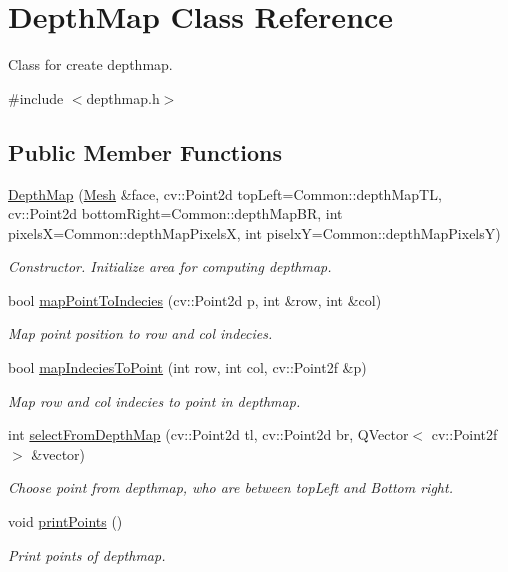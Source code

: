 \hypertarget{class_depth_map}{\section{Depth\+Map Class Reference}
\label{class_depth_map}
}


Class for create depthmap.  




{\ttfamily \#include $<$depthmap.\+h$>$}

\subsection*{Public Member Functions}
\begin{DoxyCompactItemize}
\item 
\hyperlink{class_depth_map_a0773d4da48d5d2cdf3decff197db019a}{Depth\+Map} (\hyperlink{class_mesh}{Mesh} \&face, cv\+::\+Point2d top\+Left=Common\+::depth\+Map\+T\+L, cv\+::\+Point2d bottom\+Right=Common\+::depth\+Map\+B\+R, int pixels\+X=Common\+::depth\+Map\+Pixels\+X, int piselx\+Y=Common\+::depth\+Map\+Pixels\+Y)
\begin{DoxyCompactList}\small\item\em Constructor. Initialize area for computing depthmap. \end{DoxyCompactList}\item 
bool \hyperlink{class_depth_map_a0be94946c67ba80566c19aadc026d4e6}{map\+Point\+To\+Indecies} (cv\+::\+Point2d p, int \&row, int \&col)
\begin{DoxyCompactList}\small\item\em Map point position to row and col indecies. \end{DoxyCompactList}\item 
bool \hyperlink{class_depth_map_a79ad9525acbb3d788d775f888f48ce2e}{map\+Indecies\+To\+Point} (int row, int col, cv\+::\+Point2f \&p)
\begin{DoxyCompactList}\small\item\em Map row and col indecies to point in depthmap. \end{DoxyCompactList}\item 
int \hyperlink{class_depth_map_ae5e2cebe7a07e19d86dde7d47889b505}{select\+From\+Depth\+Map} (cv\+::\+Point2d tl, cv\+::\+Point2d br, Q\+Vector$<$ cv\+::\+Point2f $>$ \&vector)
\begin{DoxyCompactList}\small\item\em Choose point from depthmap, who are between top\+Left and Bottom right. \end{DoxyCompactList}\item 
\hypertarget{class_depth_map_a130f13224c20f8e33af169f38cca9b54}{void \hyperlink{class_depth_map_a130f13224c20f8e33af169f38cca9b54}{print\+Points} ()}\label{class_depth_map_a130f13224c20f8e33af169f38cca9b54}

\begin{DoxyCompactList}\small\item\em Print points of depthmap. \end{DoxyCompactList}\end{DoxyCompactItemize}
